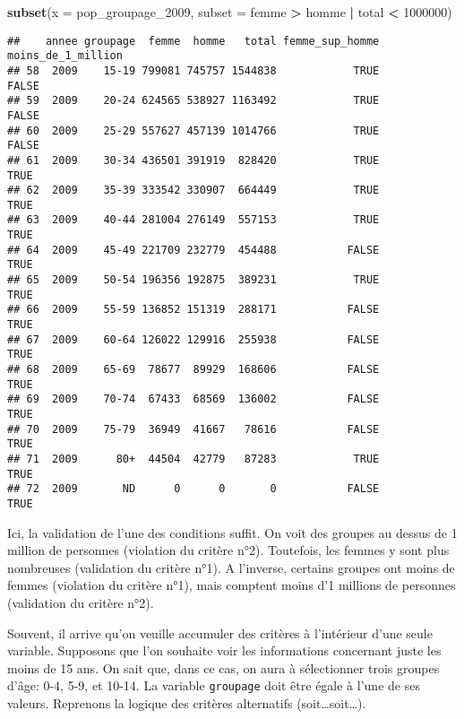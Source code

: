 \documentclass[]{book}
\newenvironment{Shaded}{\begin{snugshade}}{\end{snugshade}}
\newcommand{\KeywordTok}[1]{\textcolor[rgb]{0.13,0.29,0.53}{\textbf{#1}}}
\newcommand{\DataTypeTok}[1]{\textcolor[rgb]{0.13,0.29,0.53}{#1}}
\newcommand{\DecValTok}[1]{\textcolor[rgb]{0.00,0.00,0.81}{#1}}
\newcommand{\StringTok}[1]{\textcolor[rgb]{0.31,0.60,0.02}{#1}}
\newcommand{\OperatorTok}[1]{\textcolor[rgb]{0.81,0.36,0.00}{\textbf{#1}}}
\newcommand{\NormalTok}[1]{#1}
\begin{document}
\begin{Shaded}
\begin{Highlighting}[]
\KeywordTok{subset}\NormalTok{(}\DataTypeTok{x =}\NormalTok{ pop_groupage_}\DecValTok{2009}\NormalTok{, }\DataTypeTok{subset =}\NormalTok{ femme }\OperatorTok{>}\StringTok{ }\NormalTok{homme }\OperatorTok{|}\StringTok{ }\NormalTok{total }\OperatorTok{<}\StringTok{ }\DecValTok{1000000}\NormalTok{)}
\end{Highlighting}
\end{Shaded}

\begin{verbatim}
##    annee groupage  femme  homme   total femme_sup_homme moins_de_1_million
## 58  2009    15-19 799081 745757 1544838            TRUE              FALSE
## 59  2009    20-24 624565 538927 1163492            TRUE              FALSE
## 60  2009    25-29 557627 457139 1014766            TRUE              FALSE
## 61  2009    30-34 436501 391919  828420            TRUE               TRUE
## 62  2009    35-39 333542 330907  664449            TRUE               TRUE
## 63  2009    40-44 281004 276149  557153            TRUE               TRUE
## 64  2009    45-49 221709 232779  454488           FALSE               TRUE
## 65  2009    50-54 196356 192875  389231            TRUE               TRUE
## 66  2009    55-59 136852 151319  288171           FALSE               TRUE
## 67  2009    60-64 126022 129916  255938           FALSE               TRUE
## 68  2009    65-69  78677  89929  168606           FALSE               TRUE
## 69  2009    70-74  67433  68569  136002           FALSE               TRUE
## 70  2009    75-79  36949  41667   78616           FALSE               TRUE
## 71  2009      80+  44504  42779   87283            TRUE               TRUE
## 72  2009       ND      0      0       0           FALSE               TRUE
\end{verbatim}

Ici, la validation de l'une des conditions suffit. On voit des groupes
au dessus de 1 million de personnes (violation du critère n°2).
Toutefois, les femmes y sont plus nombreuses (validation du critère
n°1). A l'inverse, certains groupes ont moins de femmes (violation du
critère n°1), mais comptent moins d'1 millions de personnes (validation
du critère n°2).

Souvent, il arrive qu'on veuille accumuler des critères à l'intérieur
d'une seule variable. Supposons que l'on souhaite voir les informations
concernant juste les moins de 15 ans. On sait que, dans ce cas, on aura
à sélectionner trois groupes d'âge: 0-4, 5-9, et 10-14. La variable
\texttt{groupage} doit être égale à l'une de ses valeurs. Reprenons la
logique des critères alternatifs (soit\ldots{}soit\ldots{}).
\end{document}
